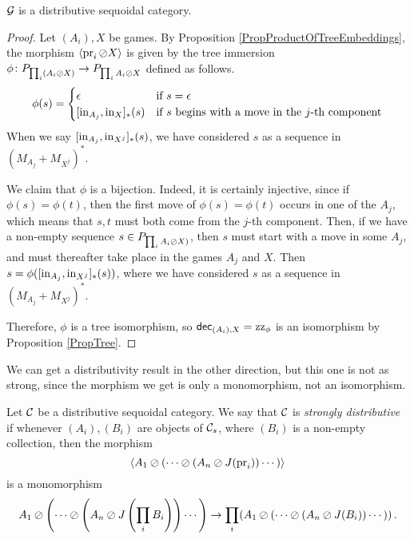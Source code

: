 \documentclass[11pt]{report}
\begin{document}
\begin{proposition}
  $\mathcal G$ is a distributive sequoidal category.
\end{proposition}
\begin{proof}
  Let $(A_i),X$ be games.
  By Proposition \ref{PropProductOfTreeEmbeddings}, the morphism $\langle \operatorname{pr}_i\oslash X\rangle$ is given by the tree immersion $\phi\colon P_{\prod_i(A_i\oslash X)}\to P_{\prod_iA_i\oslash X}$ defined as follows.
  \[
    \phi(s) = \begin{cases}
      \epsilon & \text{if $s=\epsilon$} \\
      [\inj_{A_j},\inj_{X}]_*(s) & \text{if $s$ begins with a move in the $j$-th component}
    \end{cases}
    \]
  When we say $[\operatorname{in}_{A_j},\operatorname{in}_{X^j}]_*(s)$, we have considered $s$ as a sequence in $(M_{A_j} + M_{X^j})^*$.

  We claim that $\phi$ is a bijection.  
  Indeed, it is certainly injective, since if $\phi(s)=\phi(t)$, then the first move of $\phi(s)=\phi(t)$ occurs in one of the $A_j$, which means that $s,t$ must both come from the $j$-th component.
  Then, if we have a non-empty sequence $s\in P_{\prod_iA_i \oslash X)}$, then $s$ must start with a move in some $A_j$, and must thereafter take place in the games $A_j$ and $X$.  
  Then $s=\phi([\operatorname{in}_{A_j},\operatorname{in}_{X^j}]_*(s))$, where we have considered $s$ as a sequence in $(M_{A_j} + M_{X^j})^*$.

  Therefore, $\phi$ is a tree isomorphism, so $\operatorname{{\mathsf{dec}}}_{(A_i),X} = \operatorname{zz}_\phi$ is an isomorphism by Proposition \ref{PropTree}.
\end{proof}

We can get a distributivity result in the other direction, but this one is not as strong, since the morphism we get is only a monomorphism, not an isomorphism.
\begin{definition}
  Let ${\mathcal{C}}$ be a distributive sequoidal category.  
  We say that ${\mathcal{C}}$ is \emph{strongly distributive} if whenever $(A_i),(B_i)$ are objects of ${\mathcal{C}}_s$, where $(B_i)$ is a non-empty collection, then the morphism
  \[
    \langle A_1 \oslash(\cdots \oslash (A_n \oslash J(\operatorname{pr}_i))\cdots)\rangle
    \]
  is a monomorphism
  \[
    A_1 \oslash\left(\cdots\oslash\left(A_n \oslash J\left(\prod_iB_i\right)\right)\cdots\right) \to \prod_i (A_1 \oslash (\cdots \oslash (A_n \oslash J(B_i))\cdots))\,.
    \]
\end{definition}
\end{document}
